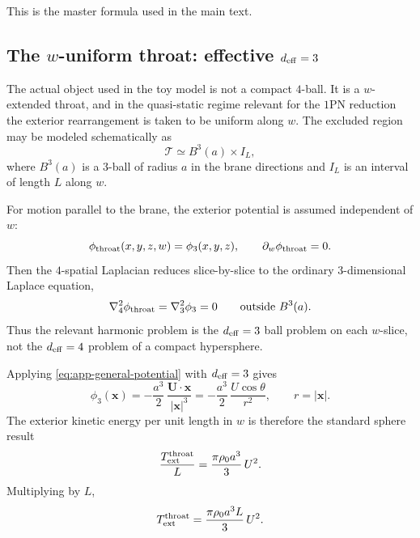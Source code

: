 \documentclass[11pt]{article}
\newcommand{\x}{\mathbf x}
\begin{document}
This is the master formula used in the main text.

\subsection{The \texorpdfstring{\(w\)}{w}-uniform throat: effective \texorpdfstring{\(d_{\rm eff}=3\)}{d eff = 3}}
\label{app:added-mass-throat}

The actual object used in the toy model is not a compact \(4\)-ball. It is a
\(w\)-extended throat, and in the quasi-static regime relevant for the \(1\)PN reduction
the exterior rearrangement is taken to be uniform along \(w\). The excluded region may be
modeled schematically as
\begin{equation}
\mathcal T \simeq B^3(a)\times I_L,
\label{eq:app-throat-geometry}
\end{equation}
where \(B^3(a)\) is a 3-ball of radius \(a\) in the brane directions and \(I_L\) is an
interval of length \(L\) along \(w\).

For motion parallel to the brane, the exterior potential is assumed independent of \(w\):
\begin{equation}
\phi_{\rm throat}(x,y,z,w)=\phi_3(x,y,z),
\qquad
\partial_w\phi_{\rm throat}=0.
\label{eq:app-throat-factorization}
\end{equation}
Then the \(4\)-spatial Laplacian reduces slice-by-slice to the ordinary \(3\)-dimensional
Laplace equation,
\begin{equation}
\nabla_4^2\phi_{\rm throat}
=
\nabla_3^2\phi_3
=
0
\qquad
\text{outside } B^3(a).
\label{eq:app-throat-laplace}
\end{equation}
Thus the relevant harmonic problem is the \(d_{\rm eff}=3\) ball problem on each
\(w\)-slice, not the \(d_{\rm eff}=4\) problem of a compact hypersphere.

Applying \eqref{eq:app-general-potential} with \(d_{\rm eff}=3\) gives
\begin{equation}
\phi_3(\x)
=
-\frac{a^3}{2}\,
\frac{\mathbf U\!\cdot\!\x}{|\x|^3}
=
-\frac{a^3}{2}\,\frac{U\cos\theta}{r^2},
\qquad
r=|\x|.
\label{eq:app-throat-potential}
\end{equation}
The exterior kinetic energy per unit length in \(w\) is therefore the standard sphere
result
\begin{equation}
\frac{T_{\rm ext}^{\rm throat}}{L}
=
\frac{\pi\rho_0 a^3}{3}\,U^2.
\label{eq:app-throat-energy-density}
\end{equation}
Multiplying by \(L\),
\begin{equation}
T_{\rm ext}^{\rm throat}
=
\frac{\pi\rho_0 a^3 L}{3}\,U^2.
\label{eq:app-throat-energy}
\end{equation}
\end{document}
